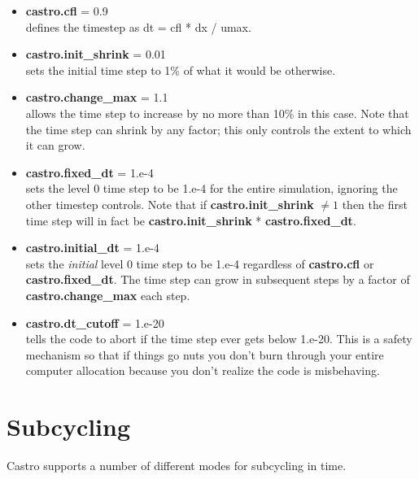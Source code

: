\begin{itemize}

\item {\bf castro.cfl} = 0.9 \\
defines the timestep as dt = cfl * dx / umax.

\item {\bf castro.init\_shrink} = 0.01 \\
sets the initial time step to 1\% of what it would be otherwise.  

\item {\bf castro.change\_max} = 1.1\\
allows the time step to increase by no more than 10\% in this case.    Note that the time step
can shrink by any factor; this only controls the extent to which it can grow.

\item {\bf castro.fixed\_dt} = 1.e-4\\
sets the level 0 time step to be 1.e-4 for the entire simulation, 
ignoring the other timestep controls.   Note that if {\bf castro.init\_shrink} $\neq 1$
then the first time step will in fact be {\bf castro.init\_shrink} * {\bf castro.fixed\_dt}.

\item {\bf castro.initial\_dt} = 1.e-4\\
sets the {\it initial} level 0 time step to be 1.e-4 regardless of 
{\bf castro.cfl} or {\bf castro.fixed\_dt}.  The time step can
grow in subsequent steps by a factor of {\bf castro.change\_max} each step.

\item {\bf castro.dt\_cutoff} = 1.e-20\\
tells the code to abort if the time step ever gets below 1.e-20. 
This is a safety mechanism so that if things go nuts you don't burn through your 
entire computer allocation because you don't realize the code is misbehaving.

\end{itemize}

\section{Subcycling}
Castro supports a number of different modes for subcycling in time.

